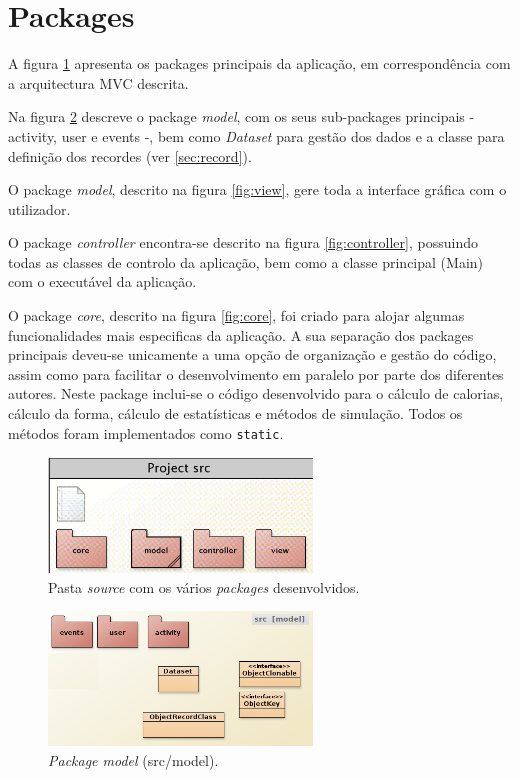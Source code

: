 \documentclass[a4paper,10pt]{report}
\begin{document}
\section{Packages}
\label{sec:packages}
A figura \ref{fig:src} apresenta os packages principais da aplicação, em correspondência com a arquitectura MVC descrita.

Na figura \ref{fig:model} descreve o package \emph{model}, com os seus sub-packages principais - activity, user e events -, 
bem como \emph{Dataset} para gestão dos dados e a classe para definição dos recordes (ver \ref{sec:record}).

O package \emph{model}, descrito na figura \ref{fig:view}, gere toda a interface gráfica com o utilizador.

O package \emph{controller} encontra-se descrito na figura \ref{fig:controller}, possuindo todas as classes de controlo da aplicação, 
bem como a classe principal (Main) com o executável da aplicação.

O package \emph{core}, descrito na figura \ref{fig:core}, foi criado para alojar algumas funcionalidades mais especificas da aplicação.
A sua separação dos packages principais deveu-se unicamente a uma opção de organização e gestão do código, 
assim como para facilitar o desenvolvimento em paralelo por parte dos diferentes autores.
Neste package inclui-se o código desenvolvido para o cálculo de calorias, cálculo da forma, cálculo de estatísticas e métodos de simulação.
Todos os métodos foram implementados como \verb!static!.

\begin{figure}
\centering
\includegraphics[width=7cm]{src.png}
\caption{Pasta \emph{source} com os vários \emph{packages} desenvolvidos.}
\label{fig:src}
\end{figure}

\begin{figure}
\centering
\includegraphics[width=7cm]{model.png}
\caption{\emph{Package model} (src/model).}
\label{fig:model}
\end{figure}
\end{document}
